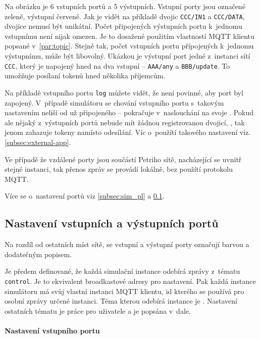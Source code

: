 Na obrázku je 6 vstupních portů a 5 výstupních. Vstupní porty jsou označené zeleně, výstupní červeně. Jak je vidět na příkladě dvojic \texttt{CCC/IN1} a \texttt{CCC/DATA}, dvojice nemusí být unikátní. Počet připojených výstupních portu k~jednomu vstupnímu není nijak omezen. Je to dosažené použitím vlastností MQTT klientu popsané v~\ref{par:topic}. Stejně tak, počet vstupních portu přípojených k~jednomu výstupnímu, může být libovolný. Ukázkou je výstupní port jedné z~instanci sítí \texttt{CCC}, který je napojený hned na dva vstupní -- \texttt{AAA/any} a \texttt{BBB/update}. To umožňuje posílaní tokenů hned několika příjemcům.

Na příkladě vstupního portu \texttt{log} můžete vidět, že není povinné, aby port byl zapojený. V~případě simulátoru se chování vstupního portu s~takovým nastavením  neliší od už připojeného -- pokračuje v~naslouchání na svoje . Pokud ale nějaký z~výstupních portů nebude mít žádnou registrovanou dvojicí, , tak jenom zahazuje tokeny namísto odesílání. Víc o~použítí takového nastavení viz. \ref{subsec:external-app}.

Ve případě že vzdálené porty jsou součástí Petriho sítě, nacházející se uvnitř stejné instanci, tak přenos zpráv se provádí lokálně, bez použítí protokolu MQTT.

Více se o~nastavení portů viz \ref{subsec:sim_pl} a \ref{subsec:remote-ports-setup}.

\subsection{Nastavení vstupních a výstupních portů}
\label{subsec:remote-ports-setup}

Na rozdíl od ostatních míst sítě, se vstupní a výstupní porty označují barvou a dodatečným popisem.

Je předem definované, že každá simulační instance odebírá zprávy z~tématu \texttt{control}. Je to ekvivalent broadkastové adresy pro nastavení. Pak každá instance simulátoru má svůj vlastní instanci MQTT klientu, id kterého se používá pro osobní zprávy určené instanci. Téma kterou odebírá instance je . Nastavení ostatních tématu je práce pro uživatele a je popsána v~dale.

\paragraph{Nastavení vstupního portu}

